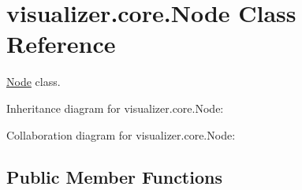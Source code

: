 \hypertarget{classvisualizer_1_1core_1_1Node}{}\section{visualizer.\+core.\+Node Class Reference}
\label{classvisualizer_1_1core_1_1Node}


\hyperlink{classvisualizer_1_1core_1_1Node}{Node} class.  




Inheritance diagram for visualizer.\+core.\+Node\+:


Collaboration diagram for visualizer.\+core.\+Node\+:
\subsection*{Public Member Functions}
